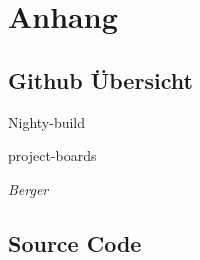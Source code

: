 
\section{Anhang}

\subsection{Github Übersicht}
Nighty-build

project-boards
\begin{flushright}
\emph{Berger}
\end{flushright}

\subsection{Source Code}